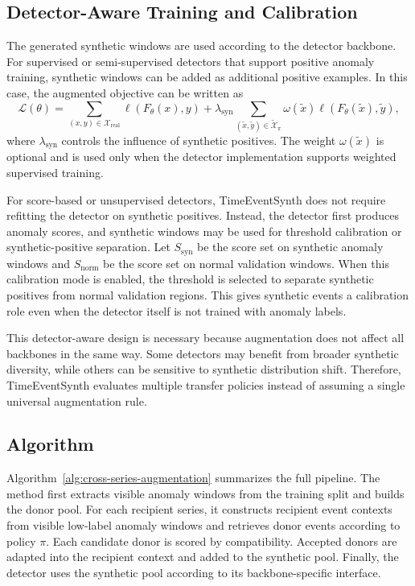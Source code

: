 \documentclass[conference]{IEEEtran}
\begin{document}
\subsection{Detector-Aware Training and Calibration}

The generated synthetic windows are used according to the detector backbone.
For supervised or semi-supervised detectors that support positive anomaly
training, synthetic windows can be added as additional positive examples. In
this case, the augmented objective can be written as
\[
\mathcal{L}(\theta)
=
\sum_{(x,y)\in\mathcal{X}_{\mathrm{real}}}
\ell(F_{\theta}(x),y)
+
\lambda_{\mathrm{syn}}
\sum_{(\tilde{x},\tilde{y})\in\widetilde{\mathcal{X}}_{\pi}}
\omega(\tilde{x})
\ell(F_{\theta}(\tilde{x}),\tilde{y}),
\]
where $\lambda_{\mathrm{syn}}$ controls the influence of synthetic positives.
The weight $\omega(\tilde{x})$ is optional and is used only when the detector
implementation supports weighted supervised training.

For score-based or unsupervised detectors, TimeEventSynth does not require
refitting the detector on synthetic positives. Instead, the detector first
produces anomaly scores, and synthetic windows may be used for threshold
calibration or synthetic-positive separation. Let $S_{\mathrm{syn}}$ be the
score set on synthetic anomaly windows and $S_{\mathrm{norm}}$ be the score set
on normal validation windows. When this calibration mode is enabled, the
threshold is selected to separate synthetic positives from normal validation
regions. This gives synthetic events a calibration role even when the detector
itself is not trained with anomaly labels.

This detector-aware design is necessary because augmentation does not affect
all backbones in the same way. Some detectors may benefit from broader
synthetic diversity, while others can be sensitive to synthetic distribution
shift. Therefore, TimeEventSynth evaluates multiple transfer policies instead
of assuming a single universal augmentation rule.

\subsection{Algorithm}

Algorithm~\ref{alg:cross-series-augmentation} summarizes the full pipeline.
The method first extracts visible anomaly windows from the training split and
builds the donor pool. For each recipient series, it constructs recipient event
contexts from visible low-label anomaly windows and retrieves donor events
according to policy $\pi$. Each candidate donor is scored by compatibility.
Accepted donors are adapted into the recipient context and added to the
synthetic pool. Finally, the detector uses the synthetic pool according to its
backbone-specific interface.
\end{document}
